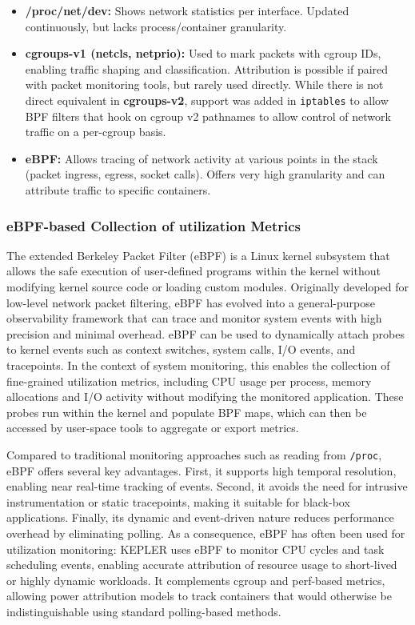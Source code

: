 \begin{itemize}
    \item \textbf{/proc/net/dev:} Shows network statistics per interface. Updated continuously, but lacks process/container granularity.
    \item \textbf{cgroups-v1 (net\textunderscore cls, net\textunderscore prio):} Used to mark packets with cgroup IDs, enabling traffic shaping and classification. Attribution is possible if paired with packet monitoring tools, but rarely used directly. While there is not direct equivalent in \textbf{cgroups-v2}, support was added in \texttt{iptables} to allow BPF filters that hook on cgroup v2 pathnames to allow control of network traffic on a per-cgroup basis.
    \item \textbf{eBPF:} Allows tracing of network activity at various points in the stack (packet ingress, egress, socket calls). Offers very high granularity and can attribute traffic to specific containers.
\end{itemize}

\subsubsection*{eBPF-based Collection of utilization Metrics}
\label{sec:ebpf_metrics}

The extended Berkeley Packet Filter (eBPF) is a Linux kernel subsystem that allows the safe execution of user-defined programs within the kernel without modifying kernel source code or loading custom modules. Originally developed for low-level network packet filtering, eBPF has evolved into a general-purpose observability framework that can trace and monitor system events with high precision and minimal overhead. eBPF can be used to dynamically attach probes to kernel events such as context switches, system calls, I/O events, and tracepoints. In the context of system monitoring, this enables the collection of fine-grained utilization metrics, including CPU usage per process, memory allocations and I/O activity without modifying the monitored application. These probes run within the kernel and populate BPF maps, which can then be accessed by user-space tools to aggregate or export metrics.

Compared to traditional monitoring approaches such as reading from \texttt{/proc}, eBPF offers several key advantages. First, it supports high temporal resolution, enabling near real-time tracking of events. Second, it avoids the need for intrusive instrumentation or static tracepoints, making it suitable for black-box applications. Finally, its dynamic and event-driven nature reduces performance overhead by eliminating polling. As a consequence, eBPF has often been used for utilization monitoring: KEPLER uses eBPF to monitor CPU cycles and task scheduling events, enabling accurate attribution of resource usage to short-lived or highly dynamic workloads. It complements cgroup and perf-based metrics, allowing power attribution models to track containers that would otherwise be indistinguishable using standard polling-based methods.

